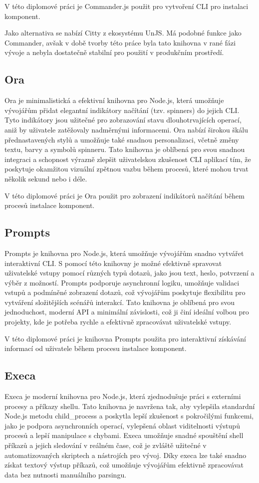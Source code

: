 V této diplomové práci je Commander.js použit pro vytvoření CLI pro instalaci komponent.

Jako alternativa se nabízí Citty z ekosystému UnJS. Má podobné funkce jako Commander, avšak v době tvorby této práce byla tato knihovna v rané fázi vývoje a nebyla dostatečně stabilní pro použití v produkčním prostředí. \cite{Citty}

\subsection{Ora}
Ora je minimalistická a efektivní knihovna pro Node.js, která umožňuje vývojářům přidat elegantní indikátory načítání (tzv. spinners) do jejich CLI. Tyto indikátory jsou užitečné pro zobrazování stavu dlouhotrvajících operací, aniž by uživatele zatěžovaly nadměrnými informacemi. Ora nabízí širokou škálu přednastavených stylů a umožňuje také snadnou personalizaci, včetně změny textu, barvy a symbolů spinneru. Tato knihovna je oblíbená pro svou snadnou integraci a schopnost výrazně zlepšit uživatelskou zkušenost CLI aplikací tím, že poskytuje okamžitou vizuální zpětnou vazbu během procesů, které mohou trvat několik sekund nebo i déle. \cite{Ora}

V této diplomové práci je Ora použit pro zobrazení indikátorů načítání během procesů instalace komponent.

\subsection{Prompts}
Prompts je knihovna pro Node.js, která umožňuje vývojářům snadno vytvářet interaktivní CLI. S pomocí této knihovny je možné efektivně spravovat uživatelské vstupy pomocí různých typů dotazů, jako jsou text, heslo, potvrzení a výběr z možností. Prompts podporuje asynchronní logiku, umožňuje validaci vstupů a podmíněné zobrazení dotazů, což vývojářům poskytuje flexibilitu pro vytváření složitějších scénářů interakcí. Tato knihovna je oblíbená pro svou jednoduchost, moderní API a minimální závislosti, což ji činí ideální volbou pro projekty, kde je potřeba rychle a efektivně zpracovávat uživatelské vstupy. \cite{Prompts}

V této diplomové práci je knihovna Prompts použita pro interaktivní získávání informací od uživatele během procesu instalace komponent.

\subsection{Execa}
Execa je moderní knihovna pro Node.js, která zjednodušuje práci s externími procesy a příkazy shellu. Tato knihovna je navržena tak, aby vylepšila standardní Node.js metodu child\_process a poskytla lepší zkušenost s pokročilými funkcemi, jako je podpora asynchronních operací, vylepšená oblast viditelnosti výstupů procesů a lepší manipulace s chybami. Execa umožňuje snadné spouštění shell příkazů a jejich sledování v reálném čase, což je zvláště užitečné v automatizovaných skriptech a nástrojích pro vývoj. Díky execa lze také snadno získat textový výstup příkazů, což umožňuje vývojářům efektivně zpracovávat data bez nutnosti manuálního parsingu. \cite{Execa}

